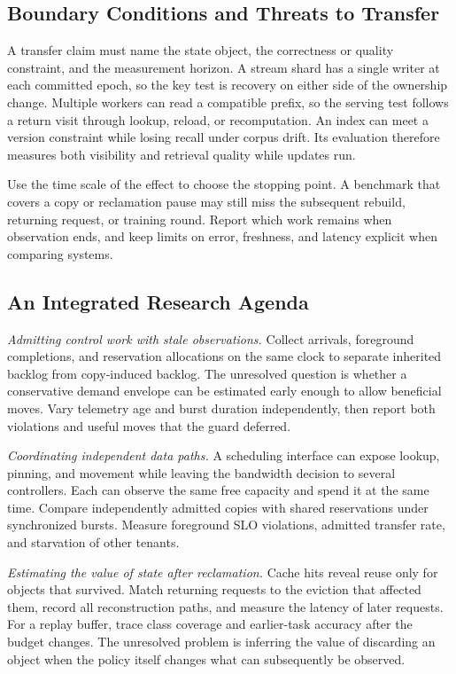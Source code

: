 \documentclass[manuscript]{acmart}
\begin{document}
\subsection{Boundary Conditions and Threats to Transfer}

A transfer claim must name the state object, the correctness or quality constraint, and the measurement horizon. A stream shard has a single writer at each committed epoch, so the key test is recovery on either side of the ownership change. Multiple workers can read a compatible prefix, so the serving test follows a return visit through lookup, reload, or recomputation. An index can meet a version constraint while losing recall under corpus drift. Its evaluation therefore measures both visibility and retrieval quality while updates run.

Use the time scale of the effect to choose the stopping point. A benchmark that covers a copy or reclamation pause may still miss the subsequent rebuild, returning request, or training round. Report which work remains when observation ends, and keep limits on error, freshness, and latency explicit when comparing systems.

\subsection{An Integrated Research Agenda}

\emph{Admitting control work with stale observations.} Collect arrivals, foreground completions, and reservation allocations on the same clock to separate inherited backlog from copy-induced backlog. The unresolved question is whether a conservative demand envelope can be estimated early enough to allow beneficial moves. Vary telemetry age and burst duration independently, then report both violations and useful moves that the guard deferred.

\emph{Coordinating independent data paths.} A scheduling interface can expose lookup, pinning, and movement while leaving the bandwidth decision to several controllers. Each can observe the same free capacity and spend it at the same time. Compare independently admitted copies with shared reservations under synchronized bursts. Measure foreground SLO violations, admitted transfer rate, and starvation of other tenants.

\emph{Estimating the value of state after reclamation.} Cache hits reveal reuse only for objects that survived. Match returning requests to the eviction that affected them, record all reconstruction paths, and measure the latency of later requests. For a replay buffer, trace class coverage and earlier-task accuracy after the budget changes. The unresolved problem is inferring the value of discarding an object when the policy itself changes what can subsequently be observed.
\end{document}
